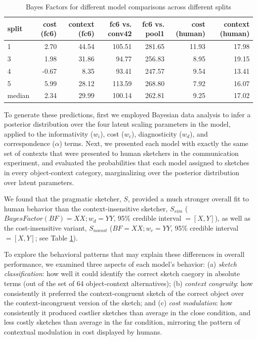 \documentclass[9pt,twocolumn,twoside]{pnas-new}
\begin{document}
\begin{table}[ht]
\centering
\begin{tabular}{lrrrrrr}
  \hline
split & \multicolumn{1}{p{0.35in}}{\centering cost (fc6)} & \multicolumn{1}{p{0.35in}}{\centering context (fc6)} & \multicolumn{1}{p{0.35in}}{\centering fc6 vs. conv42} & \multicolumn{1}{p{0.35in}}{\centering fc6 vs. pool1} & \multicolumn{1}{p{0.35in}}{\centering cost (human)} & \multicolumn{1}{p{0.35in}}{\centering context (human)} \\ 
  \hline
1 & 2.70 & 44.54 & 105.51 & 281.65 & 11.93 & 17.98 \\ 
  3 & 1.98 & 31.86 & 94.77 & 256.83 & 8.95 & 19.15 \\ 
  4 & -0.67 & 8.35 & 93.41 & 247.57 & 9.54 & 13.41 \\ 
  5 & 5.99 & 28.12 & 113.59 & 268.80 & 7.92 & 16.07 \\ 
  median & 2.34 & 29.99 & 100.14 & 262.81 & 9.25 & 17.02 \\ 
   \hline
\end{tabular}
\caption{Bayes Factors for different model comparisons across different splits}
\label{model_comparison}
\end{table}

To generate these predictions, first we employed Bayesian data analysis to infer a posterior distribution over the four latent scaling parameters in the model, applied to the informativity ($w_{i}$), cost ($w_{c}$), diagnosticity ($w_{d}$), and correspondence ($\alpha$) terms. 
Next, we presented each model with exactly the same set of contexts that were presented to human sketchers in the communication experiment, and evaluated the probabilities that each model assigned to sketches in every object-context category, marginalizing over the posterior distribution over latent parameters. 

We found that the pragmatic sketcher, $S$, provided a much stronger overall fit to human behavior than the context-insensitive sketcher, $S_{sim}$ ($Bayes Factor (BF) = XX; w_d = YY$, 95\% credible interval $= [X, Y]$), as well as the cost-insensitive variant, $S_{nocost}$ ($BF = XX; w_c = YY$, 95\% credible interval $=[X, Y]$; see Table \ref{model_comparison}).

To explore the behavioral patterns that may explain these differences in overall performance, we examined three aspects of each model's behavior: (a) \textit{sketch classification}: how well it could identify the correct sketch caegory in absolute terms (out of the set of 64 object-context alternatives); (b) \textit{context congruity}: how consistently it preferred the context-congruent sketch of the correct object over the context-incongruent version of the sketch; and (c) \textit{cost modulation}: how consistently it produced costlier sketches than average in the close condition, and less costly sketches than average in the far condition, mirroring the pattern of contextual modulation in cost displayed by humans. 
\end{document}
